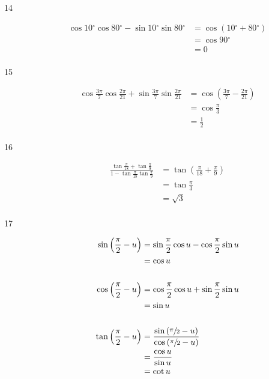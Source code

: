 \documentclass{exam}
\newcommand{\dg}{\ensuremath{^\circ}}
\begin{document}
\begin{description}
      \item[14] 
        \begin{align*}
          \cos 10 \dg \cos 80 \dg - \sin 10 \dg \sin 80 \dg & = \cos (10 \dg + 80 \dg) \\
                                                            & = \cos 90 \dg \\
                                                            & = \boxed{ 0 } \\
        \end{align*}

      \item[15] 
        \begin{align*}
          \cos \frac{3 \pi}{7}  \cos \frac{2 \pi}{21}  + \sin \frac{3 \pi}{7}  \sin \frac{2 \pi}{21} 
            & = \cos \left( \frac{3 \pi}{7}  - \frac{2 \pi}{21} \right) \\
            & = \cos \frac{\pi}{3} \\
            & = \boxed{ \frac{1}{2} } \\
        \end{align*}

      \item[16] 
        \begin{align*}
          \frac{\tan \frac{\pi}{18} + \tan \frac{\pi}{9}}{1 - \tan \frac{\pi}{18} \tan \frac{\pi}{9}} 
            &= \tan \left( \frac{\pi}{18} + \frac{\pi}{9} \right) \\
            &= \tan \frac{\pi}{3} \\
            &= \boxed{ \sqrt{3} } \\
        \end{align*}

      \item[17] 
        \begin{align*}
          \sin \left( \frac{\pi}{2} - u \right) & = \sin \frac{\pi}{2} \cos u - \cos \frac{\pi}{2} \sin u \\
                                                & = \cos u \\
          \\
          \cos \left( \frac{\pi}{2} - u \right) & = \cos \frac{\pi}{2} \cos u + \sin \frac{\pi}{2} \sin u \\
                                                & = \sin u \\
          \\
          \tan \left( \frac{\pi}{2} - u \right) 
            & = \frac{\sin \left( \sfrac{\pi}{2} - u \right)}{\cos \left( \sfrac{\pi}{2} - u \right)} \\
            & = \frac{\cos u}{\sin u} \\
            & = \cot u \\
        \end{align*}


\end{description}
\end{document}
